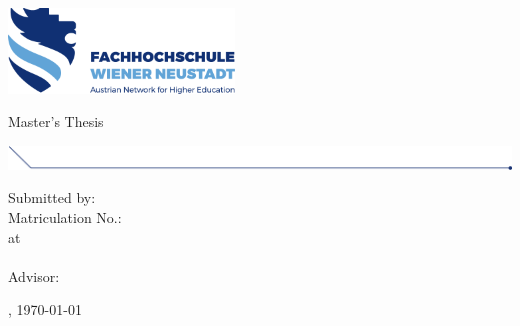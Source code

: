 
\makeatletter

\begin{titlepage}

  \includegraphics[width=6cm]{images/fhwn-logo.png}

  \vspace{70pt}
  {\noindent \linespread{1.3} \color{header-blue} \Huge \textbf{\@title} \par }
  \vspace{5pt}
  {\noindent\LARGE Master's Thesis \par}
  \vspace{20pt}

  \hspace{-35mm}
  \includegraphics[width=18.67cm]{images/titlepage-line.png}

  \vspace{15pt}

  \tabto{2cm}Submitted by: \tabto{7cm}\textbf{\@author} \\
  \tabto{2cm}Matriculation No.: \tabto{7cm}\textbf{\matriculationNumber} \\
  \vspace{15pt}
  \tabto{2cm}at \tabto{7cm}\textbf{\study}\\
  \tabto{7cm}\textbf{\institute}
  \tabto{7cm}\textbf{\studyprogram} \\
  \vspace{15pt}
  \tabto{2cm}Advisor: \tabto{7cm}\textbf{\advisor}

  \vfill

  \place, \today
      
\end{titlepage}
\makeatother

